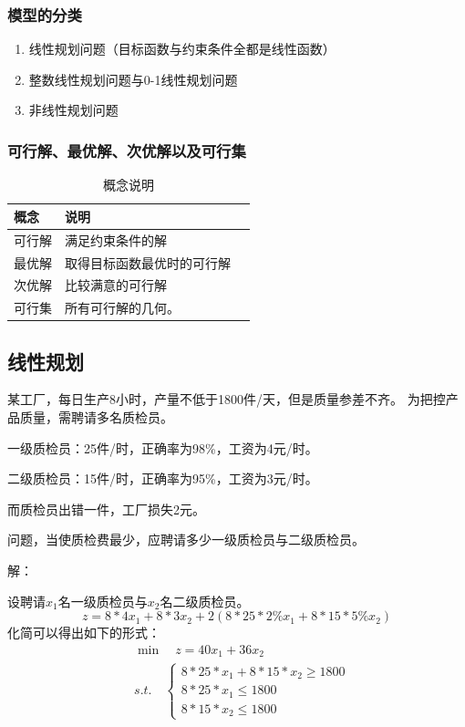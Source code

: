 \subsubsection{模型的分类}
\begin{enumerate}
\item 线性规划问题（目标函数与约束条件全都是线性函数）
\item 整数线性规划问题与0-1线性规划问题
\item 非线性规划问题
\end{enumerate}
\subsubsection{可行解、最优解、次优解以及可行集}
\begin{table}[H]
\begin{tabular}{lll}
\hline
概念 & 说明 &  \\ \hline
可行解 & 满足约束条件的解 &  \\
最优解 & 取得目标函数最优时的可行解 &  \\
次优解 & 比较满意的可行解 &  \\
可行集 & 所有可行解的几何。 &  \\ \hline
\end{tabular}
\caption{概念说明}
\end{table}
\subsection{线性规划}
\begin{example}
某工厂，每日生产8小时，产量不低于1800件/天，但是质量参差不齐。
为把控产品质量，需聘请多名质检员。\par
一级质检员：25件/时，正确率为98\%，工资为4元/时。\par
二级质检员：15件/时，正确率为95\%，工资为3元/时。\par
而质检员出错一件，工厂损失2元。\par
问题，当使质检费最少，应聘请多少一级质检员与二级质检员。
\end{example}
{\heiti 解：}\par
设聘请$x_1$名一级质检员与$x_2$名二级质检员。
\begin{equation*}
z=8*4x_1+8*3x_2+2(8*25*2\%x_1+8*15*5\%x_2)
\end{equation*}
化简可以得出如下的形式：
\begin{align*}
& \min\quad z=40x_1+36x_2 \\
& s.t.\quad
    \begin{cases}
    8*25*x_1+8*15*x_2\geq 1800 \\
    8*25*x_1\leq 1800 \\
    8*15*x_2\leq 1800
    \end{cases}
\end{align*}

